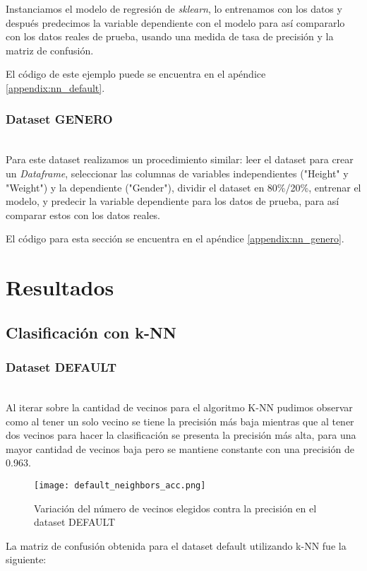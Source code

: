 \documentclass[sigconf,authorversion,nonacm]{acmart}
\begin{document}
Instanciamos el modelo de regresión de \textit{sklearn}, lo entrenamos con los datos y después predecimos la variable dependiente con el modelo para así compararlo con los datos reales de prueba, usando una medida de tasa de precisión y la matriz de confusión.

El código de este ejemplo puede se encuentra en el apéndice \ref{appendix:nn_default}.

\subsubsection{Dataset GENERO}\hfill\\
Para este dataset realizamos un procedimiento similar: leer el dataset para crear un \textit{Dataframe}, seleccionar las columnas de variables independientes ("Height" y "Weight") y la dependiente ("Gender"), dividir el dataset en 80\%/20\%, entrenar el modelo, y predecir la variable dependiente para los datos de prueba, para así comparar estos con los datos reales.

El código para esta sección se encuentra en el apéndice \ref{appendix:nn_genero}.


\section{Resultados}

\subsection{Clasificación con k-NN}

\subsubsection{Dataset DEFAULT}\hfill\\
Al iterar sobre la cantidad de vecinos para el algoritmo K-NN pudimos observar como al tener un solo vecino se tiene la precisión más baja mientras que al tener dos vecinos para hacer la clasificación se presenta la precisión más alta, para una mayor cantidad de vecinos baja pero se mantiene constante con una precisión de 0.963.

\begin{figure}[H]
  \centering
  \texttt{[image: default\_neighbors\_acc.png]}
  \caption{Variación del número de vecinos elegidos contra la precisión en el dataset DEFAULT}
\end{figure}

La matriz de confusión obtenida para el dataset default utilizando k-NN fue la siguiente:
\end{document}
